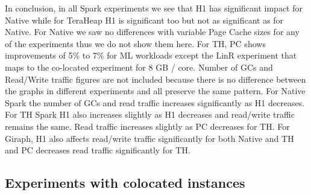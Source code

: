 In conclusion, in all Spark experiments we see that H1 has significant impact for Native while for TeraHeap H1 is significant too but not as significant as for Native. For Native we saw no differences with variable Page Cache sizes for any of the experiments thus we do not show them here. For TH, PC shows improvements of 5\% to 7\% for ML workloads except the LinR experiment that maps to the co-located experiment for 8 GB / core. Number of GCs and Read/Write traffic figures are not included because there is no difference between the graphs in different experiments and all preserve the same pattern. For Native Spark the number of GCs and read traffic increases significantly as H1 decreases. For TH Spark H1 also increases slightly as H1 decreases and read/write traffic remains the same. Read traffic increases slightly as PC decreases for TH. For Giraph, H1 also affects read/write traffic significantly for both Native and TH and PC decreases read traffic significantly for TH.

\subsection{Experiments with colocated instances}

